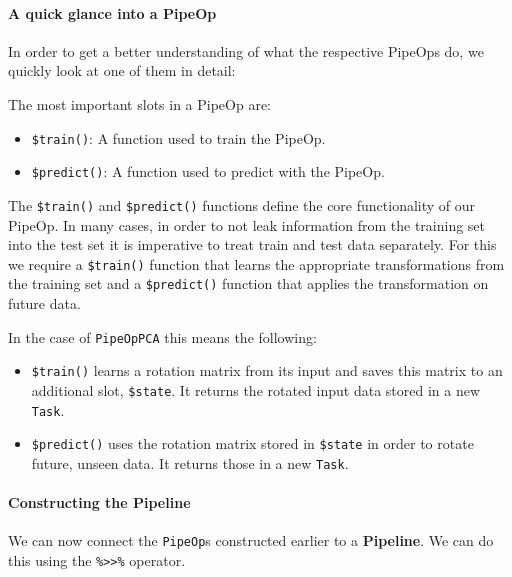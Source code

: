 \documentclass[]{article}
\providecommand{\tightlist}{%
  \setlength{\itemsep}{0pt}\setlength{\parskip}{0pt}}
\let\oldparagraph\paragraph
\renewcommand{\paragraph}[1]{\oldparagraph{#1}\mbox{}}
\begin{document}
\hypertarget{a-quick-glance-into-a-pipeop}{%
\paragraph{A quick glance into a PipeOp}\label{a-quick-glance-into-a-pipeop}}

In order to get a better understanding of what the respective PipeOps do, we quickly look at one of them in detail:

The most important slots in a PipeOp are:

\begin{itemize}
\tightlist
\item
  \texttt{\$train()}: A function used to train the PipeOp.
\item
  \texttt{\$predict()}: A function used to predict with the PipeOp.
\end{itemize}

The \texttt{\$train()} and \texttt{\$predict()} functions define the core functionality of our PipeOp.
In many cases, in order to not leak information from the training set into the test set it is imperative to treat train and test data separately.
For this we require a \texttt{\$train()} function that learns the appropriate transformations from the training set and a \texttt{\$predict()} function that applies the transformation on future data.

In the case of \texttt{PipeOpPCA} this means the following:

\begin{itemize}
\tightlist
\item
  \texttt{\$train()} learns a rotation matrix from its input and saves this matrix to an additional slot, \texttt{\$state}.
  It returns the rotated input data stored in a new \texttt{Task}.
\item
  \texttt{\$predict()} uses the rotation matrix stored in \texttt{\$state} in order to rotate future, unseen data.
  It returns those in a new \texttt{Task}.
\end{itemize}

\hypertarget{constructing-the-pipeline}{%
\paragraph{Constructing the Pipeline}\label{constructing-the-pipeline}}

We can now connect the \texttt{PipeOp}s constructed earlier to a \textbf{Pipeline}.
We can do this using the \texttt{\%\textgreater{}\textgreater{}\%} operator.
\end{document}
